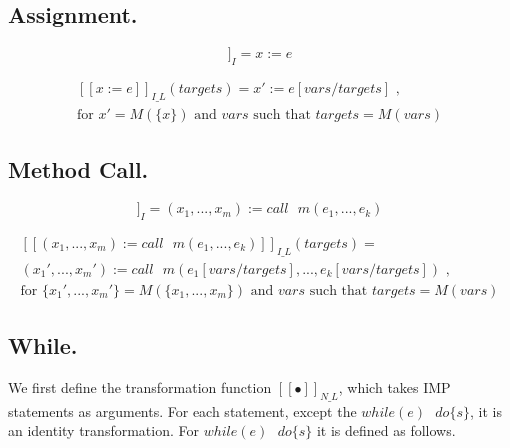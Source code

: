 \documentclass[a4paper,12pt]{article}
\begin{document}
	\subsection{Assignment.}
	
	\begin{equation*}
		[[x:=e]]_{I} = x := e 
	\end{equation*}
	
	\begin{equation*}
	\begin{multlined}
		[[x:=e]]_{I\_L}(targets) = x' := e[vars / targets] 
		\text{ ,} \\
		\text{for $x' = M(\{x\})$ 
			and $vars$ such that $targets = M(vars)$}
	\end{multlined}
	\end{equation*}
	
	\subsection{Method Call.}
	
	\begin{equation*}
		[[(x_1,...,x_m) := call \text{ } m(e_1,...,e_k)]]_I = (x_1,...,x_m) := call \text{ } m(e_1,...,e_k)
	\end{equation*}
	
	\begin{equation*}
	\begin{multlined}
		[[(x_1,...,x_m) := 
		call \text{ } m(e_1,...,e_k)]]_{I\_L}(targets) = \\  
		(x_1',..., x_m') := 
		call \text{ } m(e_1[vars / targets],...,e_k[vars / targets])
		\text{ ,} \\
		\text{for $\{x_1',...,x_m'\} = M(\{x_1,...,x_m\})$ 
		and $vars$ such that $targets = M(vars)$}
	\end{multlined}
	\end{equation*}
		
	\subsection{While.}	
	We first define the transformation function $[[\bullet]]_{N\_L}$, which takes IMP statements as arguments. For each statement, except the $while(e) \text{ } do\{s\}$, it is an identity transformation.
	For $while(e) \text{ } do\{s\}$ it is defined as follows.
	
\end{document}

